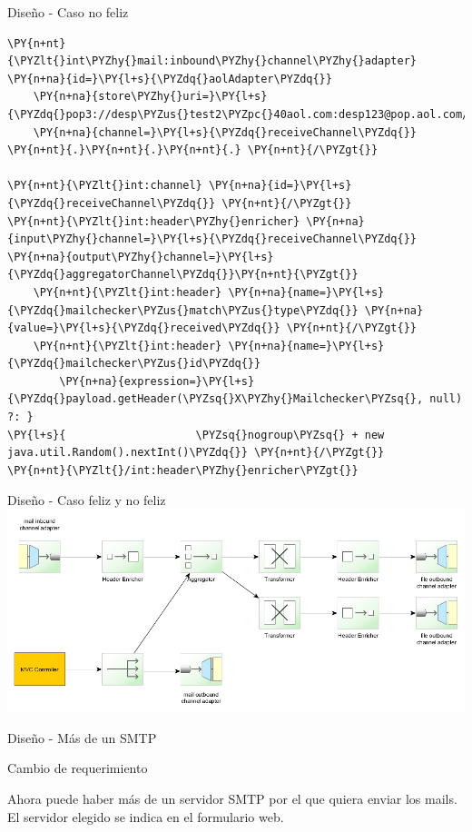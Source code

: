 \documentclass{beamer}
\begin{document}
\begin{frame}[fragile]{Diseño - Caso no feliz}
\begin{Verbatim}[fontsize=\tiny,commandchars=\\\{\}]
\PY{n+nt}{\PYZlt{}int\PYZhy{}mail:inbound\PYZhy{}channel\PYZhy{}adapter} \PY{n+na}{id=}\PY{l+s}{\PYZdq{}aolAdapter\PYZdq{}}
    \PY{n+na}{store\PYZhy{}uri=}\PY{l+s}{\PYZdq{}pop3://desp\PYZus{}test2\PYZpc{}40aol.com:desp123@pop.aol.com/INBOX\PYZdq{}}
    \PY{n+na}{channel=}\PY{l+s}{\PYZdq{}receiveChannel\PYZdq{}} \PY{n+nt}{.}\PY{n+nt}{.}\PY{n+nt}{.} \PY{n+nt}{/\PYZgt{}}

\PY{n+nt}{\PYZlt{}int:channel} \PY{n+na}{id=}\PY{l+s}{\PYZdq{}receiveChannel\PYZdq{}} \PY{n+nt}{/\PYZgt{}}
\PY{n+nt}{\PYZlt{}int:header\PYZhy{}enricher} \PY{n+na}{input\PYZhy{}channel=}\PY{l+s}{\PYZdq{}receiveChannel\PYZdq{}} \PY{n+na}{output\PYZhy{}channel=}\PY{l+s}{\PYZdq{}aggregatorChannel\PYZdq{}}\PY{n+nt}{\PYZgt{}}
    \PY{n+nt}{\PYZlt{}int:header} \PY{n+na}{name=}\PY{l+s}{\PYZdq{}mailchecker\PYZus{}match\PYZus{}type\PYZdq{}} \PY{n+na}{value=}\PY{l+s}{\PYZdq{}received\PYZdq{}} \PY{n+nt}{/\PYZgt{}}
    \PY{n+nt}{\PYZlt{}int:header} \PY{n+na}{name=}\PY{l+s}{\PYZdq{}mailchecker\PYZus{}id\PYZdq{}} 
        \PY{n+na}{expression=}\PY{l+s}{\PYZdq{}payload.getHeader(\PYZsq{}X\PYZhy{}Mailchecker\PYZsq{}, null) ?: }
\PY{l+s}{                    \PYZsq{}nogroup\PYZsq{} + new java.util.Random().nextInt()\PYZdq{}} \PY{n+nt}{/\PYZgt{}}
\PY{n+nt}{\PYZlt{}/int:header\PYZhy{}enricher\PYZgt{}}

\end{Verbatim}
\end{frame}

\begin{frame}{Diseño - Caso feliz y no feliz}
\includegraphics[width=1.0\linewidth]{sp-int-12}
\end{frame}

\begin{frame}{Diseño - Más de un SMTP}
\begin{center}
\Large{Cambio de requerimiento}
\end{center}
Ahora puede haber más de un servidor SMTP por el que quiera enviar los mails. El servidor elegido se indica en el formulario web.
\end{frame}
\end{document}

